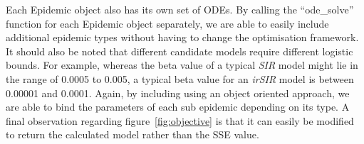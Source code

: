  Each Epidemic object also has its own set of ODEs. By calling the ``ode\_solve''
function for each Epidemic object separately, we are able to easily
include additional epidemic types without having to change the
optimisation framework. It should also be noted that different
candidate models require different logistic bounds. For example,
whereas the beta value of a typical \emph{SIR} model might lie in the
range of 0.0005 to 0.005, a typical beta value for an \emph{irSIR}
model is between 0.00001 and 0.0001. Again, by including using an
object oriented approach, we are able to bind the parameters of each
sub epidemic depending on its type. A final observation regarding
figure~\ref{fig:objective} is that it can easily be modified to return
the calculated model rather than the SSE value.

 
